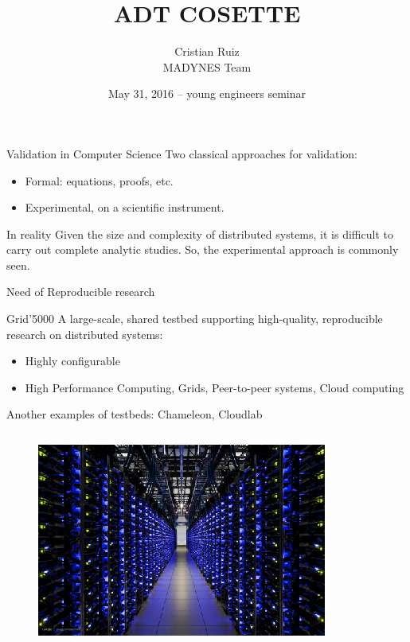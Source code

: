 \documentclass[11pt,xcolor=dvipsnames,presentation]{beamer}
\author{Cristian Ruiz \\ \vspace{0.5cm} MADYNES Team}
\date{May 31, 2016 --  young engineers seminar \mylogos}
\title{ADT COSETTE}
\begin{document}
\maketitle


\section{}
\label{sec-1}
\begin{frame}[label=sec-1-0-1]{Validation in Computer Science}
Two classical approaches for validation:

\begin{itemize}
\item \alert{Formal:} equations, proofs, etc.
\item \alert{Experimental}, on a scientific instrument.
\end{itemize}

\begin{block}{In reality}
Given the size and complexity of distributed systems,
it is difficult to carry out complete analytic studies.
\alert{So, the experimental approach is commonly seen}.
\end{block}

\begin{block}{Need of}
\alert{Reproducible research}
\end{block}
\end{frame}

\begin{frame}[label=sec-1-0-2]{Grid'5000}
A large-scale, shared testbed supporting high-quality,
reproducible research on distributed systems:

\begin{itemize}
\item Highly configurable
\item High Performance Computing, Grids, Peer-to-peer systems, Cloud computing
\end{itemize}

Another examples of testbeds: Chameleon, Cloudlab
\begin{columns}
\begin{column}{0.5\textwidth}

\begin{figure}[!h]
  \center
  \includegraphics[scale=0.33]{figures/hpc.png}
  \label{fig:hpc}
\end{figure}
\end{column}
\end{columns}
\end{frame}
\end{document}
